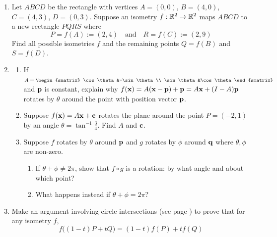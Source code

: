 \begin{exercises}
\begin{enumerate}

  
  \item Let $ABCD$ be the rectangle with vertices $A=(0,0)$, $B=(4,0)$, $C=(4,3)$, $D=(0,3)$.
	Suppose an isometry $f:\mathbb{R}^2\to\mathbb{R}^2$ maps $ABCD$ to a new rectangle $PQRS$ where
	\[P=f(A):=(2,4)\quad \text{and}\quad R=f(C):=(2,9)\]
	Find all possible isometries $f$ and the remaining points $Q=f(B)$ and $S=f(D)$.
	
	\item\label{exs:genrotref}\begin{enumerate}
	  \item If $A=\begin{smatrix}
	  \cos\theta&-\sin\theta\\
	  \sin\theta&\cos\theta
	  \end{smatrix}$ and ${\mathbf{p}}$ is constant, explain why $f({\mathbf{x}})=A({\mathbf{x}}-{\mathbf{p}})+{\mathbf{p}}=A{\mathbf{x}}+(I-A){\mathbf{p}}$ rotates by $\theta$ around the point with position vector ${\mathbf{p}}$.
	  \item Suppose $f({\mathbf{x}})=A{\mathbf{x}}+{\mathbf{c}}$ rotates the plane around the point $P=(-2,1)$ by an angle $\theta=\tan^{-1}\frac 34$. Find $A$ and ${\mathbf{c}}$.
	  \item Suppose $f$ rotates by $\theta$ around ${\mathbf{p}}$ and $g$ rotates by $\phi$ around ${\mathbf{q}}$ where $\theta,\phi$ are non-zero.
		\begin{enumerate}
	  	\item If $\theta+\phi\neq 2\pi$, show that $f\circ g$ is a rotation: by what angle and about which point?
	  	\item What happens instead if $\theta+\phi=2\pi$?
		\end{enumerate}
	\end{enumerate}
	
	
	
	\item Make an argument involving circle intersections (see page \pageref{affinity}) to prove that for any isometry $f$,
	\[f\bigl((1-t)P+tQ\bigr)=(1-t)f(P)+tf(Q)\]


\end{enumerate}
\end{exercises}
